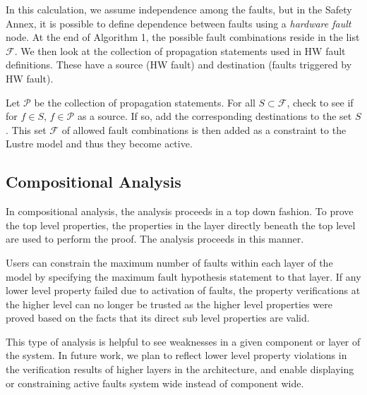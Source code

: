 In this calculation, we assume independence among the faults, but in the Safety Annex, it is possible to define dependence between faults using a \textit{hardware fault} node. At the end of Algorithm 1, the possible fault combinations reside in the list $\mathcal{F}$. We then look at the collection of propagation statements used in HW fault definitions. These have a source (HW fault) and destination (faults triggered by HW fault). 

Let $\mathcal{P}$ be the collection of propagation statements. For all $S \subset \mathcal{F}$, check to see if for $f \in S$, $f \in \mathcal{P}$ as a source. If so, add the corresponding destinations to the set $S$. This set $\mathcal{F}$ of allowed fault combinations is then added as a constraint to the Lustre model and thus they become active. 

\subsection{Compositional Analysis}
In compositional analysis, the analysis proceeds in a top down fashion. To prove the top level properties, the properties in the layer directly beneath the top level are used to perform the proof. The analysis proceeds in this manner.

 Users can constrain the maximum number of faults within each layer of the model by specifying the maximum fault hypothesis statement to that layer. If any lower level property failed due to activation of faults, the property verifications at the higher level can no longer be trusted as the higher level properties were proved based on the facts that its direct sub level properties are valid.
 
 This type of analysis is helpful to see weaknesses in a given component or layer of the system. In future work, we plan to reflect lower level property violations in the verification results of higher layers in the architecture, and enable displaying or constraining active faults system wide instead of component wide.



